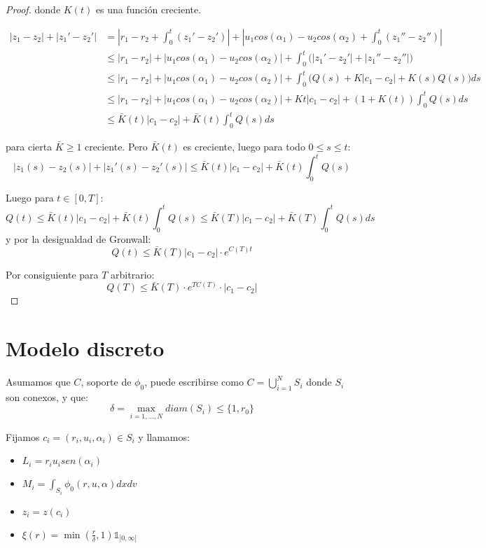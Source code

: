 \documentclass[a4paper,10pt]{scrartcl}
\theoremstyle{definition}
\numberwithin{equation}{section}
\begin{document}
\begin{proof}
 donde $K(t)$ es una función creciente.
 
 \begin{align*}
  |z_1 - z_2| + |z_1' - z_2'| &= \left|r_1 - r_2 + \int_0^t (z_1' - z_2')\right| + \left|u_1 cos(\alpha_1) - u_2 cos(\alpha_2) + \int_0^t (z_1'' - z_2'') \right|\\
  &\le |r_1 - r_2| + |u_1 cos(\alpha_1) - u_2 cos(\alpha_2)| + \int_0^t \bigg(|z_1' - z_2'| + |z_1'' - z_2''|\bigg) \\
  &\le |r_1 - r_2| + |u_1 cos(\alpha_1) - u_2 cos(\alpha_2)| + \int_0^t \bigg(Q(s) + K|c_1 - c_2| + K(s)Q(s)\bigg) ds \\
  &\le |r_1 - r_2| + |u_1 cos(\alpha_1) - u_2 cos(\alpha_2)| + Kt|c_1 - c_2| + (1 + K(t)) \int_0^t Q(s) ds\\
  &\le \bar{K}(t)|c_1 - c_2| + \bar{K}(t) \int_0^t Q(s) ds
 \end{align*}

 para cierta $\bar{K} \ge 1$ creciente. Pero $\bar{K}(t)$ es creciente, luego para todo $0 \le s \le t$:
 \[
    |z_1(s) - z_2(s)| + |z_1'(s) - z_2'(s)|  \le \bar{K}(t)|c_1 - c_2| + \bar{K}(t) \int_0^t Q(s)
 \]

 Luego para $t\in [0,T]$:
 \[
  Q(t) \le \bar{K}(t)|c_1 - c_2| + \bar{K}(t) \int_0^t Q(s) \le \bar{K}(T)|c_1 - c_2| + \bar{K}(T) \int_0^t Q(s)ds
 \]
 y por la desigualdad de Gronwall:
 \[
  Q(t) \le \bar{K}(T)|c_1 - c_2| \cdot e^{C(T)t}
 \]
 
 Por consiguiente para $T$ arbitrario:
 \[
  Q(T) \le \bar{K}(T)\cdot e^{TC(T)} \cdot |c_1 - c_2|
 \]
 
\end{proof}

\section{Modelo discreto}
Asumamos que $C$, soporte de $\phi_0$, puede escribirse como $C= \bigcup_{i=1}^N S_i$ donde $S_i$ son conexos, y que:
\[
    \delta = \max_{i=1,\ldots, N} diam(S_i) \le \{1,r_0\}
\]

Fijamos $c_i = (r_i, u_i, \alpha_i) \in S_i$ y llamamos:
\begin{itemize}
\item $L_i = r_i u_i sen(\alpha_i)$
\item $M_i = \int_{S_i} \phi_0(r,u,\alpha) dxdv$
\item $z_i = z(c_i)$
\item $\xi(r) = \min\left(\frac{r}{\delta},1\right) \mathds{1}_{]0,\infty[}$
\end{itemize}
\end{document}
